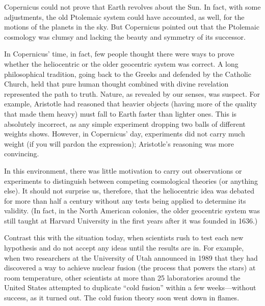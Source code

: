 \documentclass[main.tex]{subfiles}
\begin{document}
\vspace{1em}

Copernicus could not prove that Earth revolves about the Sun. In fact, with some adjustments, the old Ptolemaic system could have accounted, as well, for the motions of the planets in the sky. But Copernicus pointed out that the Ptolemaic cosmology was clumsy and lacking the beauty and symmetry of its successor.

\vspace{1em}

In Copernicus' time, in fact, few people thought there were ways to prove whether the heliocentric or the older geocentric system was correct. A long philosophical tradition, going back to the Greeks and defended by the Catholic Church, held that pure human thought combined with divine revelation represented the path to truth. Nature, as revealed by our senses, was suspect. For example, Aristotle had reasoned that heavier objects (having more of the quality that made them heavy) must fall to Earth faster than lighter ones. This is absolutely incorrect, as any simple experiment dropping two balls of different weights shows. However, in Copernicus' day, experiments did not carry much weight (if you will pardon the expression); Aristotle's reasoning was more convincing.

\vspace{1em}

In this environment, there was little motivation to carry out observations or experiments to distinguish between competing cosmological theories (or anything else). It should not surprise us, therefore, that the heliocentric idea was debated for more than half a century without any tests being applied to determine its validity. (In fact, in the North American colonies, the older geocentric system was still taught at Harvard University in the first years after it was founded in 1636.)

\vspace{1em}

Contrast this with the situation today, when scientists rush to test each new hypothesis and do not accept any ideas until the results are in. For example, when two researchers at the University of Utah announced in 1989 that they had discovered a way to achieve nuclear fusion (the process that powers the stars) at room temperature, other scientists at more than 25 laboratories around the United States attempted to duplicate ``cold fusion'' within a few weeks---without success, as it turned out. The cold fusion theory soon went down in flames.
\end{document}
